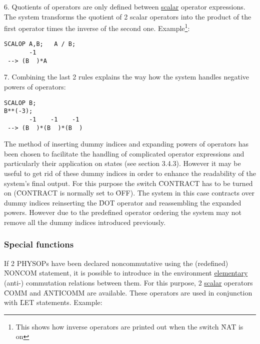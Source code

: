 6. Quotients of operators are only defined between
\underline{scalar} operator expressions.
The system transforms the quotient of 2 scalar operators into the
product of the first operator times the inverse of the second one.
Example\footnote{This shows how inverse operators are printed out when
the switch \f{NAT} is on}: \\

\begin{verbatim}
SCALOP A,B;   A / B;
       -1
 --> (B  )*A
\end{verbatim}

7. Combining the  last 2 rules explains the way how the system
handles negative powers of operators: \\

\noindent
\begin{verbatim}
SCALOP B;
B**(-3);
       -1    -1    -1
 --> (B  )*(B  )*(B  )
\end{verbatim}


The method of inserting dummy indices and expanding powers of
operators has been chosen to facilitate the handling of
complicated operator
expressions and particularly their application  on states
(see section 3.4.3). However it may be useful to get rid of these
dummy indices in order to enhance the readability of the
system's final output.
For this purpose the switch \f{CONTRACT}  has to
be turned on (\f{CONTRACT} is normally set to \f{OFF}).
The system in this case contracts over dummy indices reinserting the
\f{DOT} operator and reassembling the expanded powers.  However due to
the predefined operator ordering the system may not remove all the
dummy indices introduced previously.

\subsubsection{Special functions}


If 2 PHYSOPs have been declared noncommutative using the (redefined)
\f{NONCOM} statement, it is possible to introduce in the environment
\underline{elementary} (anti-) commutation relations between them. For
this purpose,
2 \underline{scalar} operators \f{COMM}  and
\f{ANTICOMM}  are available.
These operators are used in conjunction with \f{LET} statements.
Example: \\

